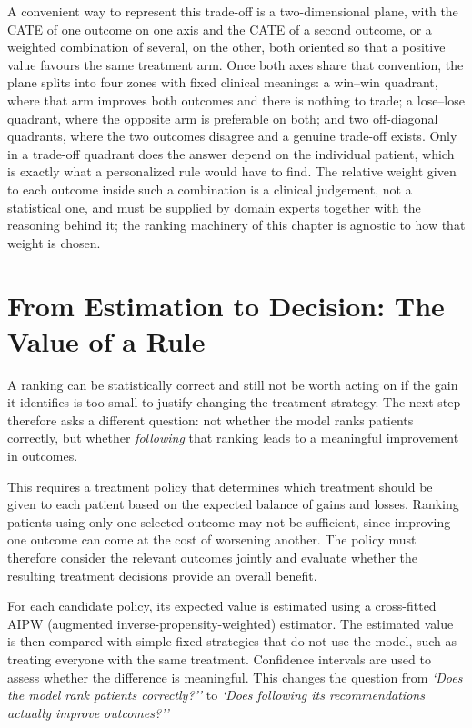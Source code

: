 A convenient way to represent this trade-off is a two-dimensional plane,
with the CATE of one outcome on one axis and the CATE of a second outcome,
or a weighted combination of several, on the other, both oriented so that a
positive value favours the same treatment arm. Once both axes share that
convention, the plane splits into four zones with fixed clinical meanings: a
win--win quadrant, where that arm improves both outcomes and there is
nothing to trade; a lose--lose quadrant, where the opposite arm is
preferable on both; and two off-diagonal quadrants, where the two outcomes
disagree and a genuine trade-off exists. Only in a trade-off quadrant does
the answer depend on the individual patient, which is exactly what a
personalized rule would have to find. The relative weight given to each
outcome inside such a combination is a clinical judgement, not a
statistical one, and must be supplied by domain experts together with the
reasoning behind it; the ranking machinery of this chapter is agnostic to
how that weight is chosen.

\section{From Estimation to Decision: The Value of a Rule}

A ranking can be statistically correct and still not be worth acting on if the
gain it identifies is too small to justify changing the treatment strategy.
The next step therefore asks a different question: not whether the model ranks
patients correctly, but whether \emph{following} that ranking leads to a
meaningful improvement in outcomes.

\vspace{10pt}

This requires a treatment policy that determines which treatment should be
given to each patient based on the expected balance of gains and losses.
Ranking patients using only one selected outcome may not be sufficient, since
improving one outcome can come at the cost of worsening another. The policy
must therefore consider the relevant outcomes jointly and evaluate whether
the resulting treatment decisions provide an overall benefit.

\vspace{10pt}

For each candidate policy, its expected value is estimated using a
cross-fitted AIPW (augmented inverse-propensity-weighted) estimator. The
estimated value is then compared with simple fixed strategies that do not use
the model, such as treating everyone with the same treatment. Confidence
intervals are used to assess whether the difference is meaningful. This
changes the question from \emph{`Does the model rank patients correctly?''}
to \emph{`Does following its recommendations actually improve outcomes?''}



